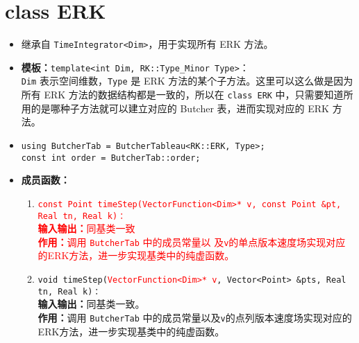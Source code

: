 \documentclass[a4paper,twoside]{ctexart}
\begin{document}
\section{class ERK}
\begin{itemize}
    \item 继承自 \texttt{TimeIntegrator<Dim>}，用于实现所有 ERK 方法。
    \item \textbf{模板：}\texttt{template<int Dim, RK::Type\_Minor Type>}：\\\texttt{Dim} 表示空间维数，\texttt{Type} 是 ERK 方法的某个子方法。这里可以这么做是因为所有 ERK 方法的数据结构都是一致的，所以在 \texttt{class ERK} 中，只需要知道所用的是哪种子方法就可以建立对应的 Butcher 表，进而实现对应的 ERK 方法。
    \item \texttt{using ButcherTab = ButcherTableau<RK::ERK, Type>;\\
    const int order = ButcherTab::order;}
    \item \textbf{成员函数：}
      \begin{enumerate}[(1)]
      \item \textcolor{red}{
          \texttt{const Point timeStep(VectorFunction<Dim>* v,
            const Point \&pt, Real tn, Real k)：}\\
          \textbf{输入输出：}同基类一致\\
                \textbf{作用：}调用 \texttt{ButcherTab} 中的成员常量以
                及\texttt{v}的单点版本速度场实现对应的ERK方法，进一步实现基类中的纯虚函数。
          }
                \item \texttt{void timeStep(}\textcolor{red}{\texttt{VectorFunction<Dim>* v}}\texttt{, Vector<Point> \&pts, Real tn, Real k)：}\\
                \textbf{输入输出：}同基类一致。\\
                \textbf{作用：}调用 \texttt{ButcherTab} 中的成员常量以及\texttt{v}的点列版本速度场实现对应的ERK方法，进一步实现基类中的纯虚函数。
            \end{enumerate}
\end{itemize}
\end{document}
